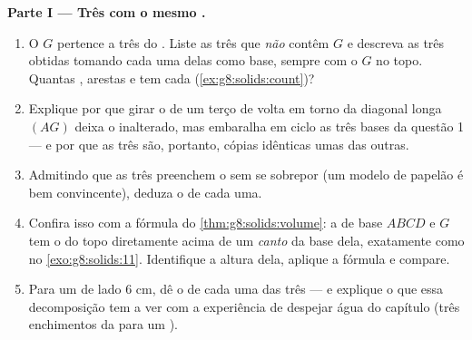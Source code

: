 \begin{problem}
\medskip
\noindent\textbf{Parte I --- Três  com o mesmo .}
\begin{enumerate}
  \item O  $G$ pertence a três  do . Liste as três
         que \emph{não} contêm $G$ e descreva as três 
        obtidas tomando cada uma delas como base, sempre com o
         $G$ no topo. Quantas , arestas e  tem
        cada  (\cref{ex:g8:solids:count})?
  \item Explique por que girar o  de um terço de volta em torno da
        diagonal longa $(AG)$ deixa o  inalterado, mas embaralha
        em ciclo as três bases da questão 1 --- e por que as três
         são, portanto, cópias idênticas umas das outras.
  \item Admitindo que as três  preenchem o  sem se
        sobrepor (um modelo de papelão é bem convincente), deduza o
         de cada uma.
  \item Confira isso com a fórmula do \cref{thm:g8:solids:volume}: a
         de base $ABCD$ e  $G$ tem o  do topo
        diretamente acima de um \emph{canto} da base dela, exatamente
        como no \cref{exo:g8:solids:11}. Identifique a altura dela,
        aplique a fórmula e compare.
  \item Para um  de lado $6$ cm, dê o  de cada uma das três
         --- e explique o que essa decomposição tem a ver com
        a experiência de despejar água do capítulo (três enchimentos
        da  para um ).
\end{enumerate}


\end{problem}
